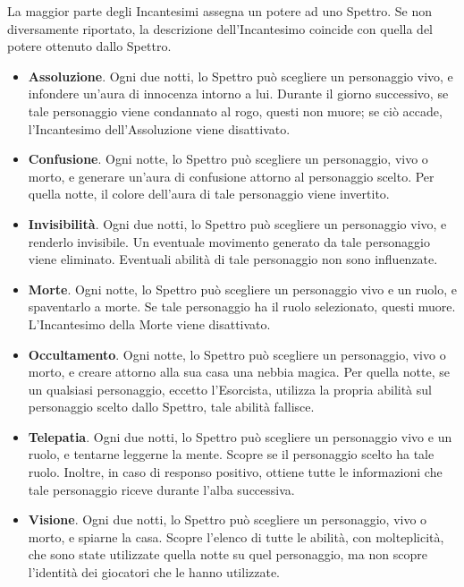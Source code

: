\documentclass[a4paper,10pt]{article}
\begin{document}
La maggior parte degli Incantesimi assegna un potere ad uno Spettro. Se non diversamente riportato, la descrizione dell'Incantesimo coincide con quella del potere ottenuto dallo Spettro.

\begin{itemize}

	\item {\bf Assoluzione}. Ogni due notti, lo Spettro può scegliere un personaggio vivo, e infondere un'aura di innocenza intorno a lui. Durante il giorno successivo, se tale personaggio viene condannato al rogo, questi non muore; se ciò accade, l'Incantesimo dell'Assoluzione viene disattivato.
	
	\item {\bf Confusione}. Ogni notte, lo Spettro può scegliere un personaggio, vivo o morto, e generare un'aura di confusione attorno al personaggio scelto. Per quella notte, il colore dell'aura di tale personaggio viene invertito.
	
	\item {\bf Invisibilità}. Ogni due notti, lo Spettro può scegliere un personaggio vivo, e renderlo invisibile. Un eventuale movimento generato da tale personaggio viene eliminato. Eventuali abilità di tale personaggio non sono influenzate.

	\item {\bf Morte}. Ogni notte, lo Spettro può scegliere un personaggio vivo e un ruolo, e spaventarlo a morte. Se tale personaggio ha il ruolo selezionato, questi muore. L'Incantesimo della Morte viene disattivato.
	 
	\item {\bf Occultamento}. Ogni notte, lo Spettro può scegliere un personaggio, vivo o morto, e creare attorno alla sua casa una nebbia magica. Per quella notte, se un qualsiasi personaggio, eccetto l'Esorcista, utilizza la propria abilità sul personaggio scelto dallo Spettro, tale abilità fallisce.

	\item {\bf Telepatia}. Ogni due notti, lo Spettro può scegliere un personaggio vivo e un ruolo, e tentarne leggerne la mente. Scopre se il personaggio scelto ha tale ruolo. Inoltre, in caso di responso positivo, ottiene tutte le informazioni che tale personaggio riceve durante l'alba successiva.

	\item {\bf Visione}. Ogni due notti, lo Spettro può scegliere un personaggio, vivo o morto, e spiarne la casa. Scopre l'elenco di tutte le abilità, con molteplicità, che sono state utilizzate quella notte su quel personaggio, ma non scopre l'identità dei giocatori che le hanno utilizzate.


\end{itemize}
\end{document}
